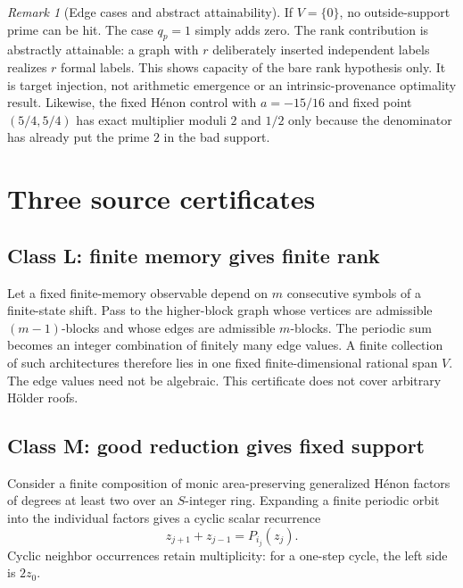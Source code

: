 \documentclass[11pt]{article}
\theoremstyle{definition}
\theoremstyle{remark}
\newtheorem{remark}[theorem]{Remark}
\begin{document}
\begin{remark}[Edge cases and abstract attainability]
If $V=\{0\}$, no outside-support prime can be hit.  The case $q_p=1$ simply
adds zero.  The rank contribution is abstractly attainable: a graph with $r$
deliberately inserted independent labels realizes $r$ formal labels.  This
shows capacity of the bare rank hypothesis only.  It is target injection, not
arithmetic emergence or an intrinsic-provenance optimality result.  Likewise, the
fixed H\'enon control with $a=-15/16$ and fixed point $(5/4,5/4)$ has exact
multiplier moduli $2$ and $1/2$ only because the denominator has already put
the prime $2$ in the bad support.
\end{remark}

\section{Three source certificates}
\label{sec:sources}

\subsection{Class L: finite memory gives finite rank}

Let a fixed finite-memory observable depend on $m$ consecutive symbols of a
finite-state shift.  Pass to the higher-block graph whose vertices are
admissible $(m-1)$-blocks and whose edges are admissible $m$-blocks.  The
periodic sum becomes an integer combination of finitely many edge values.
A finite collection of such architectures therefore lies in one fixed
finite-dimensional rational span $V$.  The edge values need not be
algebraic.  This certificate does not cover arbitrary H\"older roofs.

\subsection{Class M: good reduction gives fixed support}
\label{subsec:M}

Consider a finite composition of monic area-preserving generalized H\'enon
factors of degrees at least two over an $S$-integer ring.  Expanding a finite
periodic orbit into the individual factors gives a cyclic scalar recurrence
\begin{equation}
 z_{j+1}+z_{j-1}=P_{i_j}(z_j).
 \label{eq:henon-recurrence}
\end{equation}
Cyclic neighbor occurrences retain multiplicity: for a one-step cycle, the
left side is $2z_0$.
\end{document}
